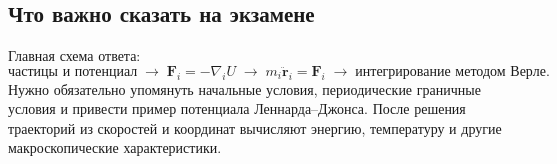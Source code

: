 \subsection{Что важно сказать на экзамене}

Главная схема ответа:
\[
    \text{частицы и потенциал}
    \;\longrightarrow\;
    \mathbf F_i=-\nabla_i U
    \;\longrightarrow\;
    m_i\ddot{\mathbf r}_i=\mathbf F_i
    \;\longrightarrow\;
    \text{интегрирование методом Верле}.
\]
Нужно обязательно упомянуть начальные условия, периодические граничные условия
и привести пример потенциала Леннарда--Джонса. После решения траекторий из
скоростей и координат вычисляют энергию, температуру и другие макроскопические
характеристики.

\newpage
